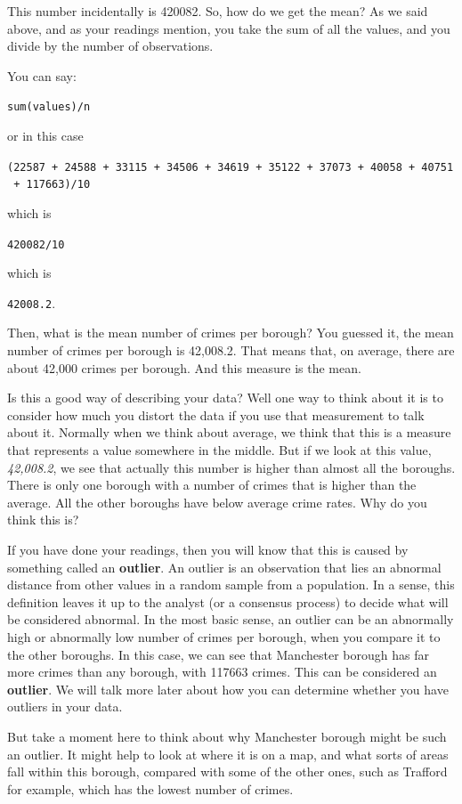 \documentclass[
]{book}
\begin{document}
This number incidentally is 420082. So, how do we get the mean? As we said above, and as your readings mention, you take the sum of all the values, and you divide by the number of observations.

You can say:

\texttt{sum(values)/n}

or in this case

\texttt{(22587\ +\ 24588\ +\ 33115\ +\ 34506\ +\ 34619\ +\ 35122\ +\ 37073\ +\ 40058\ +\ 40751\ +\ 117663)/10}

which is

\texttt{420082/10}

which is

\texttt{42008.2}.

Then, what is the mean number of crimes per borough? You guessed it, the mean number of crimes per borough is 42,008.2. That means that, on average, there are about 42,000 crimes per borough. And this measure is the mean.

Is this a good way of describing your data? Well one way to think about it is to consider how much you distort the data if you use that measurement to talk about it. Normally when we think about average, we think that this is a measure that represents a value somewhere in the middle. But if we look at this value, \emph{42,008.2}, we see that actually this number is higher than almost all the boroughs. There is only one borough with a number of crimes that is higher than the average. All the other boroughs have below average crime rates. Why do you think this is?

If you have done your readings, then you will know that this is caused by something called an \textbf{outlier}. An outlier is an observation that lies an abnormal distance from other values in a random sample from a population. In a sense, this definition leaves it up to the analyst (or a consensus process) to decide what will be considered abnormal. In the most basic sense, an outlier can be an abnormally high or abnormally low number of crimes per borough, when you compare it to the other boroughs. In this case, we can see that Manchester borough has far more crimes than any borough, with 117663 crimes. This can be considered an \textbf{outlier}. We will talk more later about how you can determine whether you have outliers in your data.

But take a moment here to think about why Manchester borough might be such an outlier. It might help to look at where it is on a map, and what sorts of areas fall within this borough, compared with some of the other ones, such as Trafford for example, which has the lowest number of crimes.
\end{document}
